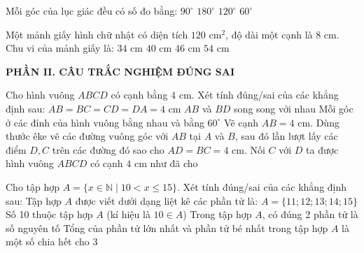 \documentclass[12pt,a4paper]{article}
\begin{document}
\begin{ex}
Mỗi góc của lục giác đều có số đo bằng:
\choice
{$90^\circ$}
{$180^\circ$}
{\True $120^\circ$}
{$60^\circ$}
\end{ex}

\begin{ex}
Một mảnh giấy hình chữ nhật có diện tích $120\text{ cm}^2$, độ dài một cạnh là $8\text{ cm}$. Chu vi của mảnh giấy là:
\choice
{$34\text{ cm}$}
{$40\text{ cm}$}
{\True $46\text{ cm}$}
{$54\text{ cm}$}
\end{ex}


\setcounter{ex}{0}
\vspace{2mm}
\noindent\textbf{\large PHẦN II. CÂU TRẮC NGHIỆM ĐÚNG SAI}
\vspace{1mm}
\begin{ex}
Cho hình vuông $ABCD$ có cạnh bằng $4\text{ cm}$. Xét tính đúng/sai của các khẳng định sau:
\choiceTF
{\True $AB = BC = CD = DA = 4\text{ cm}$}
{$AB$ và $BD$ song song với nhau}
{Mỗi góc ở các đỉnh của hình vuông bằng nhau và bằng $60^\circ$}
{\True Vẽ cạnh $AB = 4\text{ cm}$. Dùng thước êke vẽ các đường vuông góc với $AB$ tại $A$ và $B$, sau đó lần lượt lấy các điểm $D, C$ trên các đường đó sao cho $AD = BC = 4\text{ cm}$. Nối $C$ với $D$ ta được hình vuông $ABCD$ có cạnh $4\text{ cm}$ như đã cho}
\end{ex}

\begin{ex}
Cho tập hợp $A = \{x \in \mathbb{N} \mid 10 < x \le 15\}$. Xét tính đúng/sai của các khẳng định sau:
\choiceTF
{\True Tập hợp $A$ được viết dưới dạng liệt kê các phần tử là: $A = \{11; 12; 13; 14; 15\}$}
{Số 10 thuộc tập hợp $A$ (kí hiệu là $10 \in A$)}
{\True Trong tập hợp $A$, có đúng 2 phần tử là số nguyên tố}
{Tổng của phần tử lớn nhất và phần tử bé nhất trong tập hợp $A$ là một số chia hết cho 3}
\end{ex}
\end{document}
